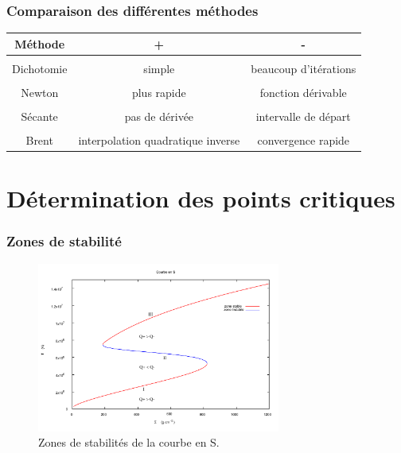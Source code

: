 
\begin{frame}
\frametitle{Comparaison des différentes méthodes}

   \begin{tabular}{|c|c|c|}
     \hline
        Méthode & + & - \\
     \hline
     \\
     Dichotomie & simple & beaucoup d'itérations  
     \\  
     \hline
     \\
     Newton & plus rapide  & fonction dérivable 
     \\ 
     \hline
     \\  
     Sécante & pas de dérivée & intervalle de départ 
     \\  
     \hline  
     \\  
     Brent & interpolation quadratique inverse & convergence rapide 
     \\  
     \hline
   \end{tabular}
\end{frame}



\section{Détermination des points critiques}
\begin{frame}
\frametitle{Zones de stabilité}

   \begin{figure}[htb!]
      \includegraphics[width=8cm]{figures/stable.pdf}
      \caption{Zones de stabilités de la courbe en S.}
    \end{figure}
\end{frame}

